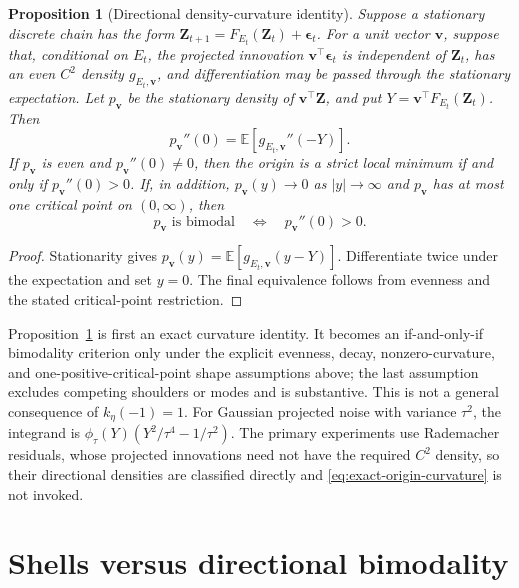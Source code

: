 \documentclass[11pt]{article}
\newtheorem{proposition}[theorem]{Proposition}
\theoremstyle{definition}
\newcommand{\E}{\mathbb E}
\newcommand{\vvec}{\mathbf v}
\begin{document}
\begin{proposition}[Directional density-curvature identity]
\label{prop:mode-curvature}
Suppose a stationary discrete chain has the form
$\mathbf Z_{t+1}=F_{E_t}(\mathbf Z_t)+\boldsymbol\epsilon_t$.  For a unit
vector $\vvec$, suppose that, conditional on $E_t$, the projected innovation
$\vvec^\top\boldsymbol\epsilon_t$ is independent of $\mathbf Z_t$, has an
even $C^2$ density $g_{E_t,\vvec}$, and differentiation may be passed through
the stationary expectation.  Let $p_{\vvec}$ be the stationary density of
$\vvec^\top\mathbf Z$, and put
$Y=\vvec^\top F_{E_t}(\mathbf Z_t)$.  Then
\begin{equation}
 p_{\vvec}''(0)
 =\E\left[
 g_{E_t,\vvec}''(-Y)
 \right].
 \label{eq:exact-origin-curvature}
\end{equation}
If $p_{\vvec}$ is even and $p_{\vvec}''(0)\neq0$, then the origin is a strict
local minimum if and only if $p_{\vvec}''(0)>0$.  If, in addition,
$p_{\vvec}(y)\to0$ as $|y|\to\infty$ and $p_{\vvec}$ has at most one critical
point on $(0,\infty)$, then
\begin{equation}
 p_{\vvec}\text{ is bimodal}
 \quad\Longleftrightarrow\quad p_{\vvec}''(0)>0.
 \label{eq:bimodal-iff-curvature}
\end{equation}
\end{proposition}

\begin{proof}
Stationarity gives
$p_{\vvec}(y)=\E[g_{E_t,\vvec}(y-Y)]$.  Differentiate twice under the
expectation and set $y=0$.  The final equivalence follows from evenness and
the stated critical-point restriction.
\end{proof}

Proposition~\ref{prop:mode-curvature} is first an exact curvature identity.  It
becomes an if-and-only-if bimodality criterion only under the explicit
evenness, decay, nonzero-curvature, and one-positive-critical-point shape
assumptions above; the last assumption excludes competing shoulders or modes
and is substantive.  This is not a general consequence of $k_\eta(-1)=1$.
For Gaussian projected noise with variance $\tau^2$, the integrand is
$\phi_\tau(Y)(Y^2/\tau^4-1/\tau^2)$.  The primary experiments use Rademacher
residuals, whose projected innovations need not have the required $C^2$
density, so their directional densities are classified directly and
\eqref{eq:exact-origin-curvature} is not invoked.

\section{Shells versus directional bimodality}
\label{sec:shells}
\end{document}
